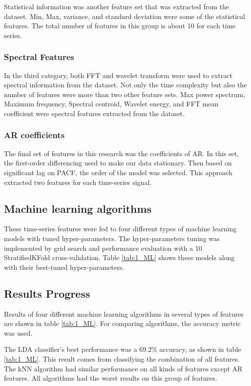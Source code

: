 Statistical information was another feature set that was extracted from the dataset. Min, Max, variance, and standard deviation were some of the statistical features. The total number of features in this group is about 10 for each time series.  

\subsubsection{Spectral Features}

In the third category, both FFT and wavelet transform were used to extract spectral information from the dataset. Not only the time complexity but also the number of features were more than two other feature sets. 
Max power spectrum, Maximum frequency, Spectral centroid, Wavelet energy, and FFT mean coefficient were spectral features extracted from the dataset.

\subsubsection{\Gls{AR} coefficients}

The final set of features in this research was the coefficients of \gls{AR}. In this set, the first-order differencing used to make our data stationary. Then based on significant lag on \gls{PACF}, the order of the model  was selected. This approach extracted two features for each time-series signal.

\subsection{Machine learning algorithms}

These time-series features were fed to four different types of machine learning models with tuned hyper-parameters. The hyper-parameters tuning was implemented by grid search and performance evaluation with a 10  StratifiedKFold cross-validation. Table \ref{tab:1_ML} shows these models along with their best-tuned hyper-parameters.

\subsection{Results Progress}

Results of four different machine learning algorithms in several types of features are shown in table \ref{tab:1_ML}. For comparing algorithms, the accuracy metric was used. 
 
The LDA classifier’s best performance was a 69.2\% accuracy, as shown in table \ref{tab:1_ML}. This result comes from classifying the combination of all features. 
The kNN algorithm had similar performance on all kinds of features except \gls{AR} features. All algorithms had the worst results on this group of features.

